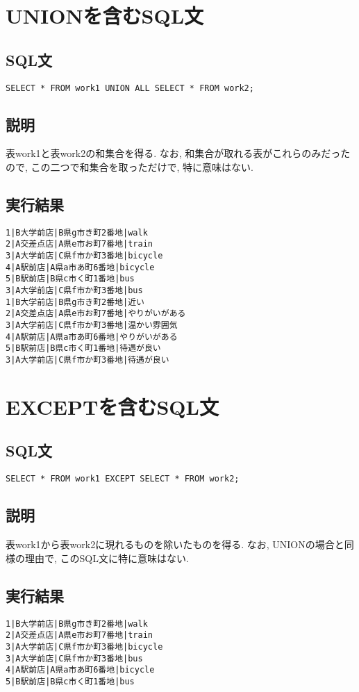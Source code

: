 \documentclass{jarticle}
\begin{document}
\section{UNIONを含むSQL文}
\subsection{SQL文}
\begin{verbatim}
SELECT * FROM work1 UNION ALL SELECT * FROM work2;
\end{verbatim}
\subsection{説明}
表work1と表work2の和集合を得る. なお, 和集合が取れる表がこれらのみだったので, この二つで和集合を取っただけで, 特に意味はない.
\subsection{実行結果}
\begin{verbatim}
1|B大学前店|B県g市き町2番地|walk
2|A交差点店|A県e市お町7番地|train
3|A大学前店|C県f市か町3番地|bicycle
4|A駅前店|A県a市あ町6番地|bicycle
5|B駅前店|B県c市く町1番地|bus
3|A大学前店|C県f市か町3番地|bus
1|B大学前店|B県g市き町2番地|近い
2|A交差点店|A県e市お町7番地|やりがいがある
3|A大学前店|C県f市か町3番地|温かい雰囲気
4|A駅前店|A県a市あ町6番地|やりがいがある
5|B駅前店|B県c市く町1番地|待遇が良い
3|A大学前店|C県f市か町3番地|待遇が良い
\end{verbatim}
\section{EXCEPTを含むSQL文}
\subsection{SQL文}
\begin{verbatim}
SELECT * FROM work1 EXCEPT SELECT * FROM work2;
\end{verbatim}
\subsection{説明}
表work1から表work2に現れるものを除いたものを得る. なお, UNIONの場合と同様の理由で, このSQL文に特に意味はない.
\subsection{実行結果}
\begin{verbatim}
1|B大学前店|B県g市き町2番地|walk
2|A交差点店|A県e市お町7番地|train
3|A大学前店|C県f市か町3番地|bicycle
3|A大学前店|C県f市か町3番地|bus
4|A駅前店|A県a市あ町6番地|bicycle
5|B駅前店|B県c市く町1番地|bus
\end{verbatim}
\end{document}
